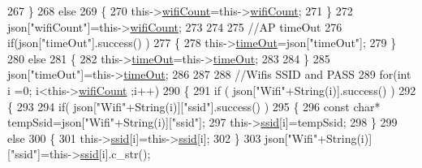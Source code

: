 \begin{DoxyCode}
267             \}
268             \textcolor{keywordflow}{else}
269             \{
270                 this->\hyperlink{classCoolWifi_ab133bd92fcb895b884deecd6678592e4}{wifiCount}=this->\hyperlink{classCoolWifi_ab133bd92fcb895b884deecd6678592e4}{wifiCount};
271             \}
272             json[\textcolor{stringliteral}{"wifiCount"}]=this->\hyperlink{classCoolWifi_ab133bd92fcb895b884deecd6678592e4}{wifiCount};
273 
274             
275             \textcolor{comment}{//AP timeOut}
276             \textcolor{keywordflow}{if}(json[\textcolor{stringliteral}{"timeOut"}].success() )
277             \{
278                 this->\hyperlink{classCoolWifi_a952111605f25156588b5632caaba1c6f}{timeOut}=json[\textcolor{stringliteral}{"timeOut"}];
279             \}
280             \textcolor{keywordflow}{else}
281             \{
282                 this->\hyperlink{classCoolWifi_a952111605f25156588b5632caaba1c6f}{timeOut}=this->\hyperlink{classCoolWifi_a952111605f25156588b5632caaba1c6f}{timeOut};
283 
284             \}
285             json[\textcolor{stringliteral}{"timeOut"}]=this->\hyperlink{classCoolWifi_a952111605f25156588b5632caaba1c6f}{timeOut};
286             
287             
288             \textcolor{comment}{//Wifis SSID and PASS}
289             \textcolor{keywordflow}{for}(\textcolor{keywordtype}{int} i =0; i<this->\hyperlink{classCoolWifi_ab133bd92fcb895b884deecd6678592e4}{wifiCount} ;i++)
290             \{
291                 \textcolor{keywordflow}{if} ( json[\textcolor{stringliteral}{"Wifi"}+String(i)].success() )
292                 \{
293                     
294                     \textcolor{keywordflow}{if}( json[\textcolor{stringliteral}{"Wifi"}+String(i)][\textcolor{stringliteral}{"ssid"}].success() )
295                     \{
296                         \textcolor{keyword}{const} \textcolor{keywordtype}{char}* tempSsid=json[\textcolor{stringliteral}{"Wifi"}+String(i)][\textcolor{stringliteral}{"ssid"}]; 
297                         this->\hyperlink{classCoolWifi_a893b21d0fed821438733bba2e73fb4c2}{ssid}[i]=tempSsid;                 
298                     \}
299                     \textcolor{keywordflow}{else}
300                     \{
301                         this->\hyperlink{classCoolWifi_a893b21d0fed821438733bba2e73fb4c2}{ssid}[i]=this->\hyperlink{classCoolWifi_a893b21d0fed821438733bba2e73fb4c2}{ssid}[i];                    
302                     \}
303                     json[\textcolor{stringliteral}{"Wifi"}+String(i)][\textcolor{stringliteral}{"ssid"}]=this->\hyperlink{classCoolWifi_a893b21d0fed821438733bba2e73fb4c2}{ssid}[i].c\_str();

\end{DoxyCode}
